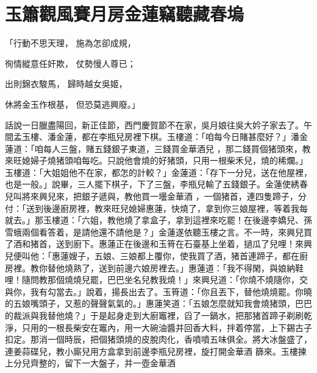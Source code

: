 %

\chapter{玉簫觀風賽月房\KG 金蓮竊聽藏春塢}

「行動不思天理，   施為怎卻成規，

徇情縱意任奸欺，  仗勢慢人尊已；

出則錦衣駿馬，   歸時越女吳姬，

休將金玉作根基，  但恐莫逃興廢。」

話說一日臘盡陽回，新正佳節，西門慶賀節不在家，吳月娘往吳大妗子家去了。午間孟玉樓、潘金蓮，都在李瓶兒房裡下棋。玉樓道：「咱每今日賭甚麼好？」潘金蓮道：「咱每人三盤，賭五錢銀子東道，三錢買金華酒兒 ，那二錢買個猪頭來，教來旺媳婦子燒猪頭咱每吃。只說他會燒的好猪頭，只用一根柴禾兒，燒的稀爛。」玉樓道：「大姐姐他不在家，都怎的計較？」金蓮道：「存下一分兒，送在他屋裡，也是一般。」說畢，三人擺下棋子，下了三盤，李瓶兒輸了五錢銀子。金蓮使綉春兒叫將來興兒來，把銀子遞與，教他買一壜金華酒 ，一個猪首，連四隻蹄子，分付：「送到後邊廚房裡，教來旺兒媳婦惠蓮，快燒了，拿到你三娘屋裡，等着我每就去。」那玉樓道：「六姐，教他燒了拿盒子，拿到這裡來吃罷！在後邊李嬌兒、孫雪蛾兩個看答着，是請他還不請他是？」金蓮遂依聽玉樓之言。不一時，來興兒買了酒和猪首，送到廚下。惠蓮正在後邊和玉筲在石臺基上坐着，撾瓜了兒哩！來興兒便叫他：「惠蓮嫂子，五娘、三娘都上覆你，使我買了酒，猪首連蹄子，都在廚房裡。教你替他燒熟了，送到前邊六娘房裡去。」惠蓮道：「我不得閑，與娘納鞋哩！隨問教那個燒燒兒罷，巴巴坐名兒教我燒！」來興兒道：「你燒不燒隨你，交與你，我有勾當去。」說着，揚長出去了。玉筲道：「你且丟下，替他燒燒罷。你曉的五娘嘴頭子，又惹的聲聲氣氣的。」惠蓮笑道：「五娘怎麼就知我會燒猪頭，巴巴的裁派與我替他燒？」于是起身走到大廚竈裡，舀了一鍋水，把那猪首蹄子剃刷乾淨，只用的一根長柴安在竈內，用一大碗油醬并回香大料，拌着停當，上下錫古子扣定。那消一個時辰，把個猪頭燒的皮脫肉化，香噴噴五味俱全。將大冰盤盛了，連姜蒜碟兒，教小廝兒用方盒拿到前邊李瓶兒房裡，旋打開金華酒 篩來。玉樓揀上分兒齊整的，留下一大盤子，并一壺金華酒 